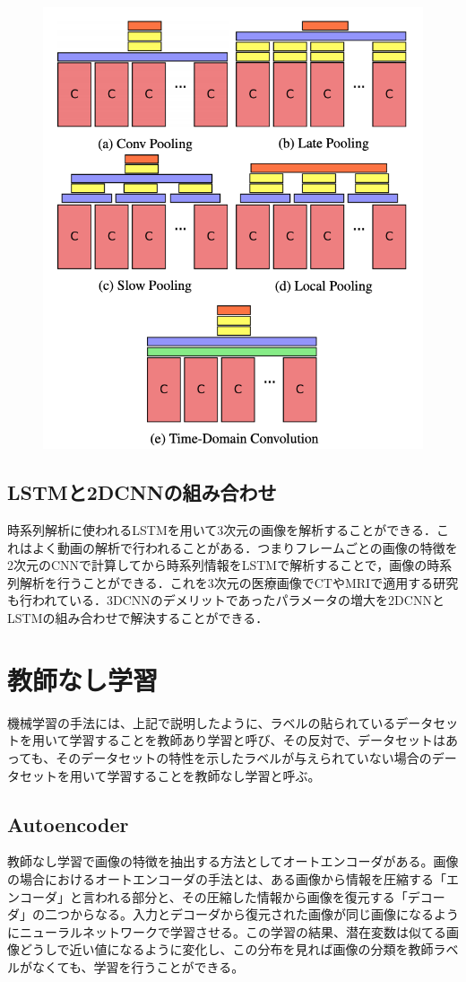 \begin{figure}[h]
\centering
\includegraphics[width=0.7\linewidth]{fig/stacked_conv.png}
\caption{}
\label{fig:}
\end{figure}

\subsection{LSTMと2DCNNの組み合わせ}
時系列解析に使われるLSTMを用いて3次元の画像を解析することができる．これはよく動画の解析で行われることがある．つまりフレームごとの画像の特徴を2次元のCNNで計算してから時系列情報をLSTMで解析することで，画像の時系列解析を行うことができる．これを3次元の医療画像でCTやMRIで適用する研究も行われている．3DCNNのデメリットであったパラメータの増大を2DCNNとLSTMの組み合わせで解決することができる．

\section{教師なし学習}
機械学習の手法には、上記で説明したように、ラベルの貼られているデータセットを用いて学習することを教師あり学習と呼び、その反対で、データセットはあっても、そのデータセットの特性を示したラベルが与えられていない場合のデータセットを用いて学習することを教師なし学習と呼ぶ。

\subsection{Autoencoder}
教師なし学習で画像の特徴を抽出する方法としてオートエンコーダがある。画像の場合におけるオートエンコーダの手法とは、ある画像から情報を圧縮する「エンコーダ」と言われる部分と、その圧縮した情報から画像を復元する「デコーダ」の二つからなる。入力とデコーダから復元された画像が同じ画像になるようにニューラルネットワークで学習させる。この学習の結果、潜在変数は似てる画像どうしで近い値になるように変化し、この分布を見れば画像の分類を教師ラベルがなくても、学習を行うことができる。

